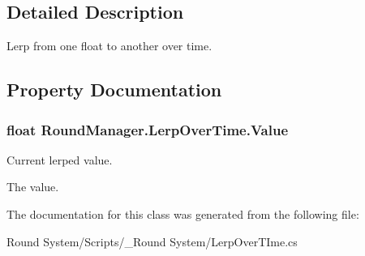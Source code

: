 \subsection{Detailed Description}
Lerp from one float to another over time. 



\subsection{Property Documentation}
\hypertarget{class_round_manager_1_1_lerp_over_time_af08cee578d3b1f907bf4b273a6cb564e}{}
\subsubsection[{Value}]{\setlength{\rightskip}{0pt plus 5cm}float Round\+Manager.\+Lerp\+Over\+Time.\+Value\hspace{0.3cm}{\ttfamily [get]}}\label{class_round_manager_1_1_lerp_over_time_af08cee578d3b1f907bf4b273a6cb564e}


Current lerped value. 

The value.

The documentation for this class was generated from the following file\+:\begin{DoxyCompactItemize}
\item 
Round System/\+Scripts/\+\_\+\+Round System/Lerp\+Over\+T\+Ime.\+cs\end{DoxyCompactItemize}
